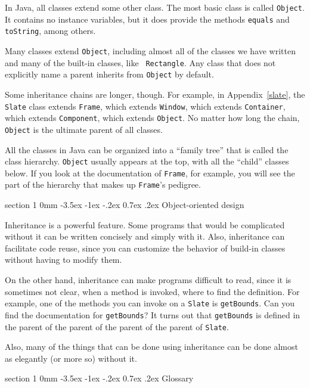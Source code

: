 \documentclass{book}
\makeatletter
\renewcommand{\section}{\@startsection 
    {section} {1} {0mm}%
    {-3.5ex \@plus -1ex \@minus -.2ex}%
    {0.7ex \@plus.2ex}%
    {\normalfont\Large\bfseries}}
\makeatother
\begin{document}
In Java, all classes extend some other class.  The most basic class is
called {\tt Object}.  It contains no instance variables, but it does
provide the methods {\tt equals} and {\tt toString}, among others.

Many classes extend {\tt Object}, including almost all of the classes
we have written and many of the built-in classes, like {\tt
Rectangle}.  Any class that does not explicitly name a parent inherits
from {\tt Object} by default.

Some inheritance chains are longer, though.  For example, 
in Appendix~\ref{slate}, the
{\tt Slate} class
extends {\tt Frame}, which
extends {\tt Window}, which extends {\tt Container}, which extends
{\tt Component}, which extends {\tt Object}.  No matter how long the
chain, {\tt Object} is the ultimate parent of all classes.

All the classes in Java can be organized into a ``family tree'' that
is called the class hierarchy.  {\tt Object} usually appears at the
top, with all the ``child'' classes below.  If you look at the
documentation of {\tt Frame}, for example, you will see the part of
the hierarchy that makes up {\tt Frame}'s pedigree.


\section {Object-oriented design}

Inheritance is a powerful feature.  Some programs that would be
complicated without it can be written concisely and simply
with it.  Also, inheritance can facilitate code reuse, since you can
customize the behavior of build-in classes without having to modify
them.

On the other hand, inheritance can make programs difficult to read,
since it is sometimes not clear, when a method is invoked, where to
find the definition.  For example, one of the methods you can invoke
on a {\tt Slate} is {\tt getBounds}.  Can you find the documentation
for {\tt getBounds}?  It turns out that {\tt getBounds} is defined in
the parent of the parent of the parent of the parent of {\tt Slate}.

Also, many of the things that can be done using inheritance can
be done almost as elegantly (or more so) without it.


\section{Glossary}
\end{document}
